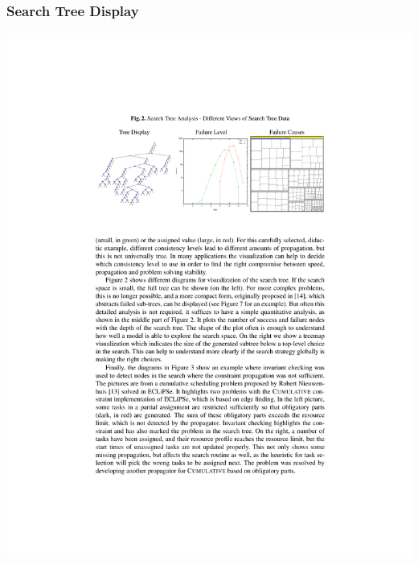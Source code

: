 \documentclass[dvipsnames,aspectratio=169]{beamer}
\begin{document}
\begin{frame}
  \frametitle{Search Tree Display \cite{DBLP:conf/cp/SimonisDFMQC10}}
  
  \includegraphics[height=.7\textheight]{images/simonis_cp_vis_tree.pdf}
  
\end{frame}
\end{document}
